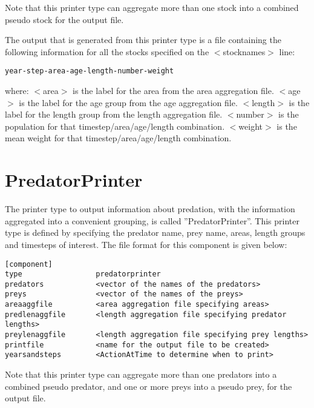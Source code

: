 \documentclass [a4paper, 10pt]{book}
\begin{document}
Note that this printer type can aggregate more than one stock into a combined pseudo stock for the output file.

\bigskip
The output that is generated from this printer type is a file containing the following information for all the stocks specified on the $<$stocknames$>$ line:

{\small\begin{verbatim}
year-step-area-age-length-number-weight
\end{verbatim}}

where:\newline
$<$area$>$ is the label for the area from the area aggregation file.\newline
$<$age$>$ is the label for the age group from the age aggregation file.\newline
$<$length$>$ is the label for the length group from the length aggregation file.\newline
$<$number$>$ is the population for that timestep/area/age/length combination.\newline
$<$weight$>$ is the mean weight for that timestep/area/age/length combination.

\section{PredatorPrinter}\label{sec:predatorprinter}
The printer type to output information about predation, with the information aggregated into a convenient grouping, is called ''PredatorPrinter''.  This printer type is defined by specifying the predator name, prey name, areas, length groups and timesteps of interest.  The file format for this component is given below:

{\small\begin{verbatim}
[component]
type                 predatorprinter
predators            <vector of the names of the predators>
preys                <vector of the names of the preys>
areaaggfile          <area aggregation file specifying areas>
predlenaggfile       <length aggregation file specifying predator lengths>
preylenaggfile       <length aggregation file specifying prey lengths>
printfile            <name for the output file to be created>
yearsandsteps        <ActionAtTime to determine when to print>
\end{verbatim}}

Note that this printer type can aggregate more than one predators into a combined pseudo predator, and one or more preys into a pseudo prey, for the output file.
\end{document}
